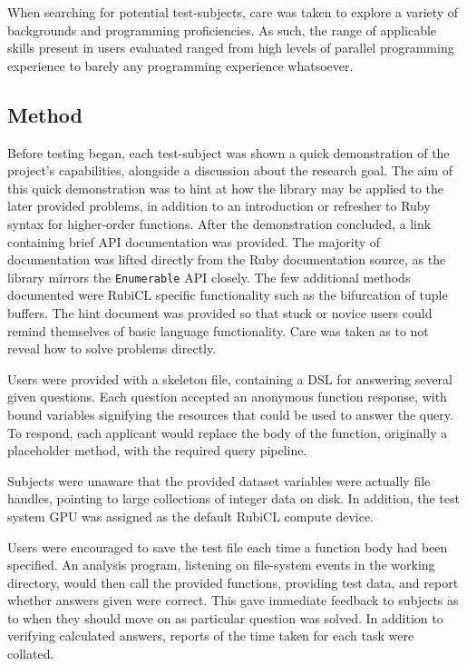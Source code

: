When searching for potential test-subjects, care was taken to explore a variety of backgrounds and programming proficiencies.
As such, the range of applicable skills present in users evaluated ranged from high levels of parallel programming experience to barely any programming experience whatsoever.

\subsection{Method}
Before testing began, each test-subject was shown a quick demonstration of the project's capabilities, alongside a discussion about the research goal.
The aim of this quick demonstration was to hint at how the library may be applied to the later provided problems, in addition to an introduction or refresher to Ruby syntax for higher-order functions. After the demonstration concluded, a link\cite{user_test_hints} containing brief \ac{API} documentation was provided. The majority of documentation was lifted directly from the Ruby documentation source, as the library mirrors the \verb|Enumerable| \ac{API} closely. The few additional methods documented were RubiCL specific functionality such as the bifurcation of tuple buffers. The hint document was provided so that stuck or novice users could remind themselves of basic language functionality. Care was taken as to not reveal how to solve problems directly.

Users were provided with a skeleton file, containing a DSL for answering several given questions. Each question accepted an anonymous function response, with bound variables signifying the resources that could be used to answer the query. To respond, each applicant would replace the body of the function, originally a placeholder method, with the required query pipeline.

Subjects were unaware that the provided dataset variables were actually file handles, pointing to large collections of integer data on disk. In addition, the test system \ac{GPU} was assigned as the default RubiCL compute device.

Users were encouraged to save the test file each time a function body had been specified. An analysis program, listening on file-system events in the working directory, would then call the provided functions, providing test data, and report whether answers given were correct. This gave immediate feedback to subjects as to when they should move on as particular question was solved. In addition to verifying calculated answers, reports of the time taken for each task were collated.


